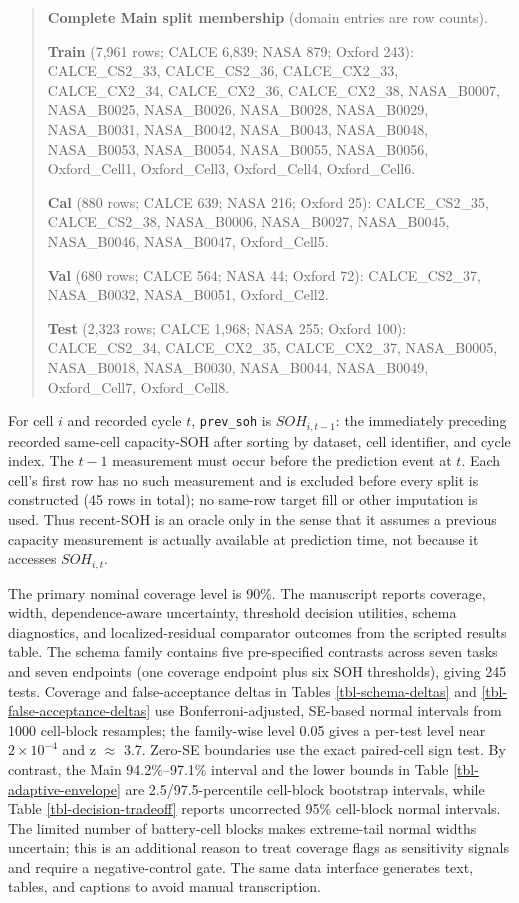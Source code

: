 \documentclass[
  number,
  preprint]{elsarticle}
\begin{document}
\begin{quote}
\scriptsize
\textbf{Complete Main split membership} (domain entries are row counts).\par
\textbf{Train} (7,961 rows; CALCE 6,839; NASA 879; Oxford 243): CALCE\_CS2\_33, CALCE\_CS2\_36, CALCE\_CX2\_33, CALCE\_CX2\_34, CALCE\_CX2\_36, CALCE\_CX2\_38, NASA\_B0007, NASA\_B0025, NASA\_B0026, NASA\_B0028, NASA\_B0029, NASA\_B0031, NASA\_B0042, NASA\_B0043, NASA\_B0048, NASA\_B0053, NASA\_B0054, NASA\_B0055, NASA\_B0056, Oxford\_Cell1, Oxford\_Cell3, Oxford\_Cell4, Oxford\_Cell6.

\textbf{Cal} (880 rows; CALCE 639; NASA 216; Oxford 25): CALCE\_CS2\_35, CALCE\_CS2\_38, NASA\_B0006, NASA\_B0027, NASA\_B0045, NASA\_B0046, NASA\_B0047, Oxford\_Cell5.

\textbf{Val} (680 rows; CALCE 564; NASA 44; Oxford 72): CALCE\_CS2\_37, NASA\_B0032, NASA\_B0051, Oxford\_Cell2.

\textbf{Test} (2,323 rows; CALCE 1,968; NASA 255; Oxford 100): CALCE\_CS2\_34, CALCE\_CX2\_35, CALCE\_CX2\_37, NASA\_B0005, NASA\_B0018, NASA\_B0030, NASA\_B0044, NASA\_B0049, Oxford\_Cell7, Oxford\_Cell8.
\end{quote}

For cell \(i\) and recorded cycle \(t\), \texttt{prev\_soh} is
\(SOH_{i,t-1}\): the immediately preceding recorded same-cell
capacity-SOH after sorting by dataset, cell identifier, and cycle index.
The \(t-1\) measurement must occur before the prediction event at \(t\).
Each cell's first row has no such measurement and is excluded before
every split is constructed (45 rows in total); no same-row target fill
or other imputation is used. Thus recent-SOH is an oracle only in the
sense that it assumes a previous capacity measurement is actually
available at prediction time, not because it accesses \(SOH_{i,t}\).

The primary nominal coverage level is 90\%. The manuscript reports
coverage, width, dependence-aware uncertainty, threshold decision
utilities, schema diagnostics, and localized-residual comparator
outcomes from the scripted results table. The schema family contains
five pre-specified contrasts across seven tasks and seven endpoints (one
coverage endpoint plus six SOH thresholds), giving 245 tests. Coverage
and false-acceptance deltas in Tables \ref{tbl-schema-deltas} and
\ref{tbl-false-acceptance-deltas} use Bonferroni-adjusted, SE-based
normal intervals from 1000 cell-block resamples; the family-wise level
0.05 gives a per-test level near \(2\times10^{-4}\) and z \(\approx\)
3.7. Zero-SE boundaries use the exact paired-cell sign test. By
contrast, the Main 94.2\%--97.1\% interval and the lower bounds in Table
\ref{tbl-adaptive-envelope} are 2.5/97.5-percentile cell-block bootstrap
intervals, while Table \ref{tbl-decision-tradeoff} reports uncorrected
95\% cell-block normal intervals. The limited number of battery-cell
blocks makes extreme-tail normal widths uncertain; this is an additional
reason to treat coverage flags as sensitivity signals and require a
negative-control gate. The same data interface generates text, tables,
and captions to avoid manual transcription.
\end{document}
